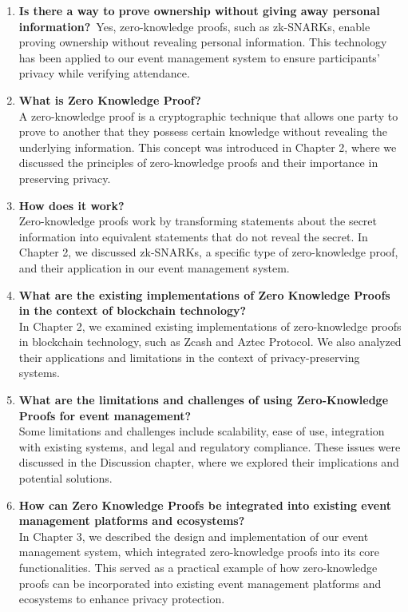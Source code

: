 \begin{enumerate}
\item \textbf{Is there a way to prove ownership without giving away personal information?}\
Yes, zero-knowledge proofs, such as zk-SNARKs, enable proving ownership without revealing personal information. This technology has been applied to our event management system to ensure participants' privacy while verifying attendance.
\item \textbf{What is Zero Knowledge Proof?}\\
A zero-knowledge proof is a cryptographic technique that allows one party to prove to another that they possess certain knowledge without revealing the underlying information. This concept was introduced in Chapter 2, where we discussed the principles of zero-knowledge proofs and their importance in preserving privacy.

\item \textbf{How does it work?}\\
Zero-knowledge proofs work by transforming statements about the secret information into equivalent statements that do not reveal the secret. In Chapter 2, we discussed zk-SNARKs, a specific type of zero-knowledge proof, and their application in our event management system.

\item \textbf{What are the existing implementations of Zero Knowledge Proofs in the context of blockchain technology?}\\
In Chapter 2, we examined existing implementations of zero-knowledge proofs in blockchain technology, such as Zcash and Aztec Protocol. We also analyzed their applications and limitations in the context of privacy-preserving systems.

\item \textbf{What are the limitations and challenges of using Zero-Knowledge Proofs for event management?}\\
Some limitations and challenges include scalability, ease of use, integration with existing systems, and legal and regulatory compliance. These issues were discussed in the Discussion chapter, where we explored their implications and potential solutions.

\item \textbf{How can Zero Knowledge Proofs be integrated into existing event management platforms and ecosystems?}\\
In Chapter 3, we described the design and implementation of our event management system, which integrated zero-knowledge proofs into its core functionalities. This served as a practical example of how zero-knowledge proofs can be incorporated into existing event management platforms and ecosystems to enhance privacy protection.


\end{enumerate}
